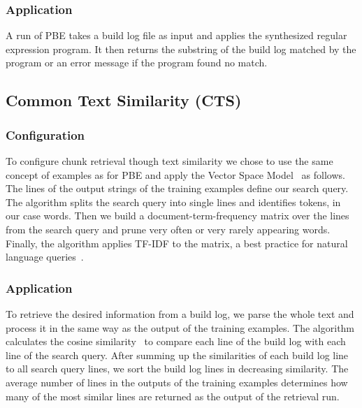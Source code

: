\subsubsection{Application}
A run of PBE takes a build log file as input and applies the
synthesized regular expression program.
It then returns the substring
of the build log matched by the program or an error message if the
program found no match.


\subsection{Common Text Similarity (CTS)}
\label{sec:expl-ts}

\subsubsection{Configuration}
To configure chunk retrieval though text similarity we chose to use
the same concept of examples as for PBE
and apply the Vector Space Model~\cite{schutze2008introduction}
as follows.
The
lines of the output strings of the training examples define our search
query.
The algorithm splits the search query into single lines and
identifies tokens, in our case words.
Then we build a
document-term-frequency matrix over the lines from the search query
and prune very often or very rarely appearing words.
Finally, the
algorithm applies TF-IDF to the matrix, a best practice for natural
language queries~\cite{lee1997document}.

\subsubsection{Application}
To retrieve the desired information from a build log, we parse the
whole text and process it in the same way as the output of the
training examples.
The algorithm calculates the cosine
similarity~\cite{korenius2007principal} to compare each line of the
build log with each line of the search query.
After summing up the
similarities of each build log line to all search query lines, we sort
the build log lines in decreasing similarity.
The average number of
lines in the outputs of the training examples determines how many of
the most similar lines are returned as the output of the retrieval
run.

